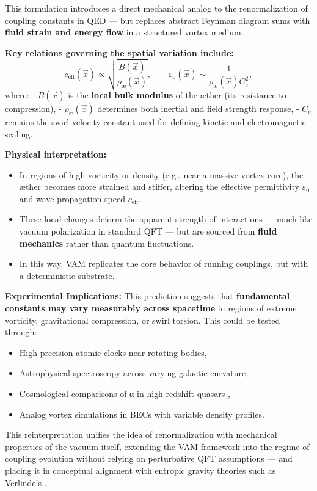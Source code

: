 This formulation introduces a direct mechanical analog to the renormalization of coupling constants in QED — but replaces abstract Feynman diagram sums with \textbf{fluid strain and energy flow} in a structured vortex medium.

\vspace{0.5em}

\textbf{Key relations governing the spatial variation include:}
\begin{equation}
    c_{\text{eff}}(\vec{x}) \propto \sqrt{ \frac{B(\vec{x})}{\rho_\text{\ae}(\vec{x})} }, \qquad
    \varepsilon_0(\vec{x}) \sim \frac{1}{\rho_\text{\ae}(\vec{x}) C_e^2},
\end{equation}
where:
- \( B(\vec{x}) \) is the \textbf{local bulk modulus} of the æther (its resistance to compression),
- \( \rho_\text{\ae}(\vec{x}) \) determines both inertial and field strength response,
- \( C_e \) remains the swirl velocity constant used for defining kinetic and electromagnetic scaling.

\vspace{0.5em}

\textbf{Physical interpretation:}
\begin{itemize}
    \item In regions of high vorticity or density (e.g., near a massive vortex core), the æther becomes more strained and stiffer, altering the effective permittivity \( \varepsilon_0 \) and wave propagation speed \( c_{\text{eff}} \).
    \item These local changes deform the apparent strength of interactions — much like vacuum polarization in standard QFT — but are sourced from \textbf{fluid mechanics} rather than quantum fluctuations.
    \item In this way, VAM replicates the core behavior of running couplings, but with a deterministic substrate.
\end{itemize}

\vspace{0.5em}

\textbf{Experimental Implications:}
This prediction suggests that \textbf{fundamental constants may vary measurably across spacetime} in regions of extreme vorticity, gravitational compression, or swirl torsion. This could be tested through:
\begin{itemize}
    \item High-precision atomic clocks near rotating bodies,
    \item Astrophysical spectroscopy across varying galactic curvature,
    \item Cosmological comparisons of α in high-redshift quasars \cite{shapiro2004variation, uzan2011varying},
    \item Analog vortex simulations in BECs with variable density profiles.
\end{itemize}

This reinterpretation unifies the idea of renormalization with mechanical properties of the vacuum itself, extending the VAM framework into the regime of coupling evolution without relying on perturbative QFT assumptions — and placing it in conceptual alignment with entropic gravity theories such as Verlinde's \cite{verlinde2016emergent}.


